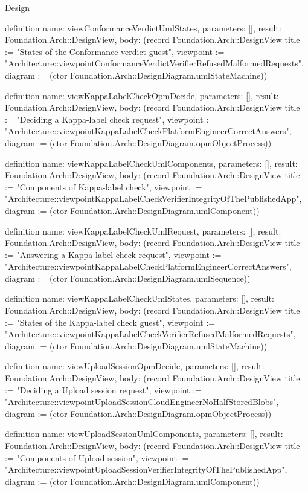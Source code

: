 \begin{lexlean}{Design}
\begin{semanticmodule}
definition{
  name: viewConformanceVerdictUmlStates,
  parameters: [],
  result: Foundation.Arch::DesignView,
  body: (record Foundation.Arch::DesignView {title := "States of the Conformance verdict guest", viewpoint := "Architecture::viewpointConformanceVerdictVerifierRefusedMalformedRequests", diagram := (ctor Foundation.Arch::DesignDiagram.umlStateMachine)})
}

definition{
  name: viewKappaLabelCheckOpmDecide,
  parameters: [],
  result: Foundation.Arch::DesignView,
  body: (record Foundation.Arch::DesignView {title := "Deciding a Kappa-label check request", viewpoint := "Architecture::viewpointKappaLabelCheckPlatformEngineerCorrectAnswers", diagram := (ctor Foundation.Arch::DesignDiagram.opmObjectProcess)})
}

definition{
  name: viewKappaLabelCheckUmlComponents,
  parameters: [],
  result: Foundation.Arch::DesignView,
  body: (record Foundation.Arch::DesignView {title := "Components of Kappa-label check", viewpoint := "Architecture::viewpointKappaLabelCheckVerifierIntegrityOfThePublishedApp", diagram := (ctor Foundation.Arch::DesignDiagram.umlComponent)})
}

definition{
  name: viewKappaLabelCheckUmlRequest,
  parameters: [],
  result: Foundation.Arch::DesignView,
  body: (record Foundation.Arch::DesignView {title := "Answering a Kappa-label check request", viewpoint := "Architecture::viewpointKappaLabelCheckPlatformEngineerCorrectAnswers", diagram := (ctor Foundation.Arch::DesignDiagram.umlSequence)})
}

definition{
  name: viewKappaLabelCheckUmlStates,
  parameters: [],
  result: Foundation.Arch::DesignView,
  body: (record Foundation.Arch::DesignView {title := "States of the Kappa-label check guest", viewpoint := "Architecture::viewpointKappaLabelCheckVerifierRefusedMalformedRequests", diagram := (ctor Foundation.Arch::DesignDiagram.umlStateMachine)})
}

definition{
  name: viewUploadSessionOpmDecide,
  parameters: [],
  result: Foundation.Arch::DesignView,
  body: (record Foundation.Arch::DesignView {title := "Deciding a Upload session request", viewpoint := "Architecture::viewpointUploadSessionCloudEngineerNoHalfStoredBlobs", diagram := (ctor Foundation.Arch::DesignDiagram.opmObjectProcess)})
}

definition{
  name: viewUploadSessionUmlComponents,
  parameters: [],
  result: Foundation.Arch::DesignView,
  body: (record Foundation.Arch::DesignView {title := "Components of Upload session", viewpoint := "Architecture::viewpointUploadSessionVerifierIntegrityOfThePublishedApp", diagram := (ctor Foundation.Arch::DesignDiagram.umlComponent)})
}


\end{semanticmodule}
\end{lexlean}

